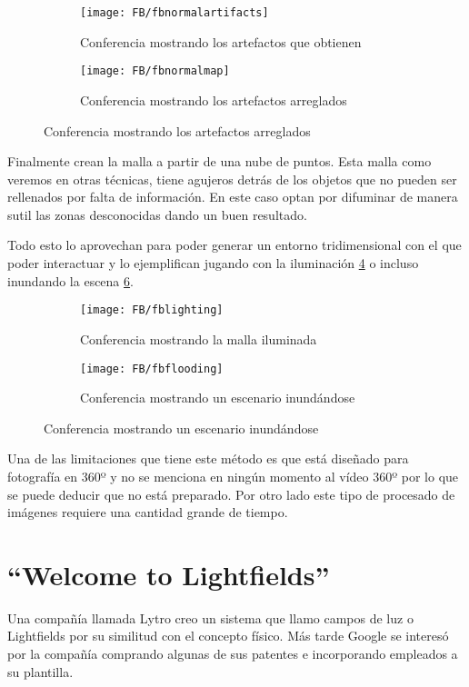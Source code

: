 \begin{figure}[h]
\centering
\begin{subfigure}{.47\linewidth}
	\centering
	\texttt{[image: FB/fbnormalartifacts]}
  \caption{Conferencia mostrando los artefactos que obtienen}
  \label{fig:fbnormalmapartifacts-example}
\end{subfigure}%
\hspace{.05\linewidth}
\begin{subfigure}{.47\linewidth}
	\centering
	\texttt{[image: FB/fbnormalmap]}
  \caption{Conferencia mostrando los artefactos arreglados}
  \label{fig:fbnormalmapcorrected-example}
\end{subfigure}
\end{figure}


Finalmente crean la malla a partir de una nube de puntos. Esta malla como veremos en otras técnicas, tiene agujeros detrás de los objetos que no pueden ser rellenados por falta de información. En este caso optan por difuminar de manera sutil las zonas desconocidas dando un buen resultado.

Todo esto lo aprovechan para poder generar un entorno tridimensional con el que poder interactuar y lo ejemplifican jugando con la iluminación \ref{fig:fblighting-example} o incluso inundando la escena \ref{fig:fbflooding-example}.

\begin{figure}[h]
\centering
\begin{subfigure}{.47\linewidth}
	\centering
	\texttt{[image: FB/fblighting]}
  \caption{Conferencia mostrando la malla iluminada}
  \label{fig:fblighting-example}
\end{subfigure}%
\hspace{.05\linewidth}
\begin{subfigure}{.47\linewidth}
	\centering
	\texttt{[image: FB/fbflooding]}
  \caption{Conferencia mostrando un escenario inundándose}
  \label{fig:fbflooding-example}
\end{subfigure}
\end{figure}

Una de las limitaciones que tiene este método es que está diseñado para fotografía en 360º y no se menciona en ningún momento al vídeo 360º por lo que se puede deducir que no está preparado. Por otro lado este tipo de procesado de imágenes requiere una cantidad grande de tiempo.

\section{``Welcome to Lightfields''}
Una compañía llamada Lytro creo un sistema que llamo campos de luz o Lightfields \cite{LytroLightfields} por su similitud con el concepto físico. Más tarde Google se interesó por la compañía comprando algunas de sus patentes e incorporando empleados a su plantilla.

